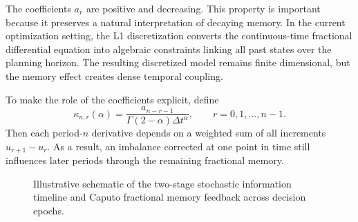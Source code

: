 The coefficients $a_r$ are positive and decreasing. This property is important because it preserves a natural interpretation of decaying memory. In the current optimization setting, the L1 discretization converts the continuous-time fractional differential equation into algebraic constraints linking all past states over the planning horizon. The resulting discretized model remains finite dimensional, but the memory effect creates dense temporal coupling.

To make the role of the coefficients explicit, define
\begin{equation}
\kappa_{n,r}(\alpha)=\frac{a_{n-r-1}}{\Gamma(2-\alpha)\Delta t^{\alpha}},\qquad r=0,1,\dots,n-1.
\end{equation}
Then each period-$n$ derivative depends on a weighted sum of all increments $u_{r+1}-u_r$. As a result, an imbalance corrected at one point in time still influences later periods through the remaining fractional memory.

\begin{figure}[H]
\centering
{}
\caption{Illustrative schematic of the two-stage stochastic information timeline and Caputo fractional memory feedback across decision epochs.}
\label{fig:timeline_schematic}
\end{figure}






